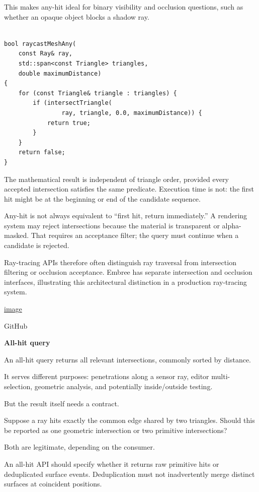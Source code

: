 This makes any-hit ideal for binary visibility and occlusion questions, such as whether an opaque object blocks a shadow ray.

\begin{verbatim}

bool raycastMeshAny(
    const Ray& ray,
    std::span<const Triangle> triangles,
    double maximumDistance)
{
    for (const Triangle& triangle : triangles) {
        if (intersectTriangle(
                ray, triangle, 0.0, maximumDistance)) {
            return true;
        }
    }
    return false;
}
\end{verbatim}

The mathematical result is independent of triangle order, provided every accepted intersection satisfies the same predicate. Execution time is not: the first hit might be at the beginning or end of the candidate sequence.

Any-hit is not always equivalent to ``first hit, return immediately.'' A rendering system may reject intersections because the material is transparent or alpha-masked. That requires an acceptance filter; the query must continue when a candidate is rejected.

Ray-tracing APIs therefore often distinguish ray traversal from intersection filtering or occlusion acceptance. Embree has separate intersection and occlusion interfaces, illustrating this architectural distinction in a production ray-tracing system. 

\href{https://www.google.com/s2/favicons?domain=https://github.com&sz=32}{image}

GitHub

\textbf{All-hit query}

An all-hit query returns all relevant intersections, commonly sorted by distance.

It serves different purposes: penetrations along a sensor ray, editor multi-selection, geometric analysis, and potentially inside/outside testing.

But the result itself needs a contract.

Suppose a ray hits exactly the common edge shared by two triangles. Should this be reported as one geometric intersection or two primitive intersections?

Both are legitimate, depending on the consumer.

An all-hit API should specify whether it returns raw primitive hits or deduplicated surface events. Deduplication must not inadvertently merge distinct surfaces at coincident positions.

